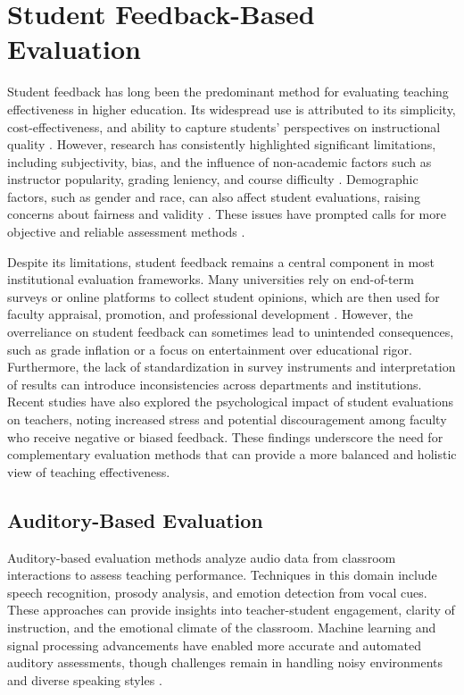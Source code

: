 
\section{Student Feedback-Based Evaluation}
Student feedback has long been the predominant method for evaluating teaching effectiveness in higher education. Its widespread use is attributed to its simplicity, cost-effectiveness, and ability to capture students' perspectives on instructional quality \cite{Ajmal2024, Husain2016}. However, research has consistently highlighted significant limitations, including subjectivity, bias, and the influence of non-academic factors such as instructor popularity, grading leniency, and course difficulty \cite{Heffernan2022, carvalho2022biases}. Demographic factors, such as gender and race, can also affect student evaluations, raising concerns about fairness and validity \cite{Steinberg2021}. These issues have prompted calls for more objective and reliable assessment methods \cite{Ginsburg2022NecessaryBI}.

Despite its limitations, student feedback remains a central component in most institutional evaluation frameworks. Many universities rely on end-of-term surveys or online platforms to collect student opinions, which are then used for faculty appraisal, promotion, and professional development \cite{8615171}. However, the overreliance on student feedback can sometimes lead to unintended consequences, such as grade inflation or a focus on entertainment over educational rigor. Furthermore, the lack of standardization in survey instruments and interpretation of results can introduce inconsistencies across departments and institutions. Recent studies have also explored the psychological impact of student evaluations on teachers, noting increased stress and potential discouragement among faculty who receive negative or biased feedback. These findings underscore the need for complementary evaluation methods that can provide a more balanced and holistic view of teaching effectiveness.

\subsection{Auditory-Based Evaluation}
Auditory-based evaluation methods analyze audio data from classroom interactions to assess teaching performance. Techniques in this domain include speech recognition, prosody analysis, and emotion detection from vocal cues. These approaches can provide insights into teacher-student engagement, clarity of instruction, and the emotional climate of the classroom. Machine learning and signal processing advancements have enabled more accurate and automated auditory assessments, though challenges remain in handling noisy environments and diverse speaking styles \cite{Wang2022, Yang2022}.

